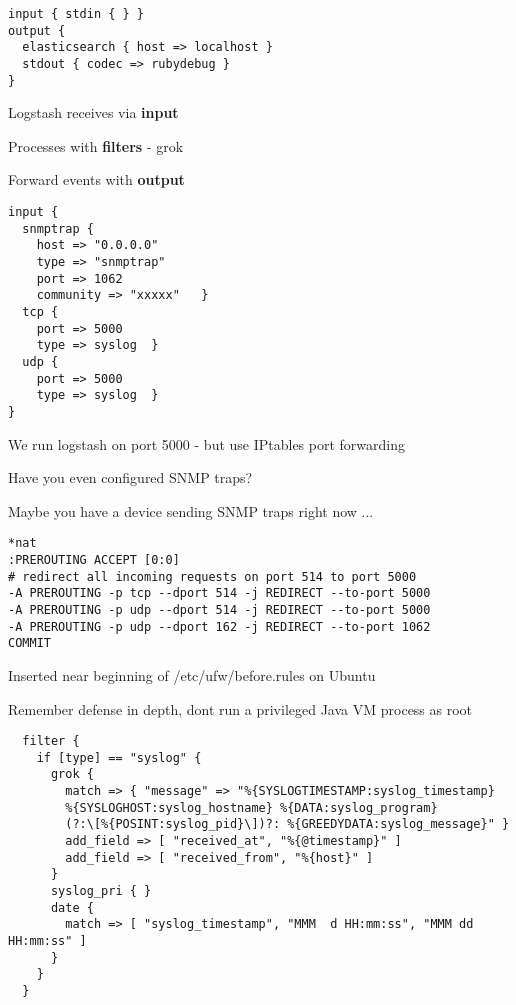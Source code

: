 \documentclass[Screen16to9,17pt]{foils}
\begin{document}
\begin{verbatim}
input { stdin { } }
output {
  elasticsearch { host => localhost }
  stdout { codec => rubydebug }
}
\end{verbatim}



\begin{list2}
\item Logstash receives via {\bf input}
\item Processes with {\bf filters} - grok
\item Forward events with {\bf output}
\end{list2}



{\footnotesize
\begin{verbatim}
input {
  snmptrap {
    host => "0.0.0.0"
    type => "snmptrap"
    port => 1062
    community => "xxxxx"   }
  tcp {
    port => 5000
    type => syslog  }
  udp {
    port => 5000
    type => syslog  }
}
\end{verbatim}
}

\begin{list2}
\item We run logstash on port 5000 - but use IPtables port forwarding
\item Have you even configured SNMP traps?
\item Maybe you have a device sending SNMP traps right now ...
\end{list2}


{\footnotesize
\begin{verbatim}
*nat
:PREROUTING ACCEPT [0:0]
# redirect all incoming requests on port 514 to port 5000
-A PREROUTING -p tcp --dport 514 -j REDIRECT --to-port 5000
-A PREROUTING -p udp --dport 514 -j REDIRECT --to-port 5000
-A PREROUTING -p udp --dport 162 -j REDIRECT --to-port 1062
COMMIT
\end{verbatim}
}

\centerline{Inserted near beginning of /etc/ufw/before.rules on Ubuntu}

Remember defense in depth, dont run a privileged Java VM process as root \smiley


{\footnotesize
\begin{verbatim}
  filter {
    if [type] == "syslog" {
      grok {
        match => { "message" => "%{SYSLOGTIMESTAMP:syslog_timestamp}
        %{SYSLOGHOST:syslog_hostname} %{DATA:syslog_program}
        (?:\[%{POSINT:syslog_pid}\])?: %{GREEDYDATA:syslog_message}" }
        add_field => [ "received_at", "%{@timestamp}" ]
        add_field => [ "received_from", "%{host}" ]
      }
      syslog_pri { }
      date {
        match => [ "syslog_timestamp", "MMM  d HH:mm:ss", "MMM dd HH:mm:ss" ]
      }
    }
  }
\end{verbatim}
}
\end{document}
